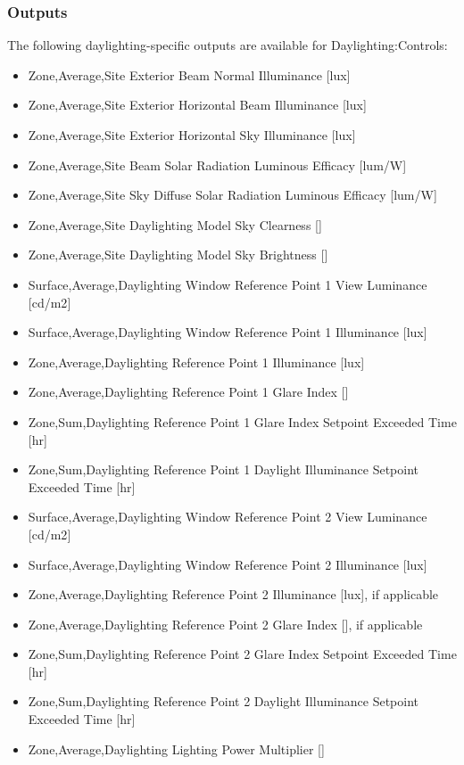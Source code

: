 \subsubsection{Outputs}\label{outputs-1-004}

The following daylighting-specific outputs are available for Daylighting:Controls:

\begin{itemize}
\item
  Zone,Average,Site Exterior Beam Normal Illuminance {[}lux{]}
\item
  Zone,Average,Site Exterior Horizontal Beam Illuminance {[}lux{]}
\item
  Zone,Average,Site Exterior Horizontal Sky Illuminance {[}lux{]}
\item
  Zone,Average,Site Beam Solar Radiation Luminous Efficacy {[}lum/W{]}
\item
  Zone,Average,Site Sky Diffuse Solar Radiation Luminous Efficacy {[}lum/W{]}
\item
  Zone,Average,Site Daylighting Model Sky Clearness {[]}
\item
  Zone,Average,Site Daylighting Model Sky Brightness {[]}
\item
  Surface,Average,Daylighting Window Reference Point 1 View Luminance {[}cd/m2{]}
\item
  Surface,Average,Daylighting Window Reference Point 1 Illuminance {[}lux{]}
\item
  Zone,Average,Daylighting Reference Point 1 Illuminance {[}lux{]}
\item
  Zone,Average,Daylighting Reference Point 1 Glare Index {[]}
\item
  Zone,Sum,Daylighting Reference Point 1 Glare Index Setpoint Exceeded Time {[}hr{]}
\item
  Zone,Sum,Daylighting Reference Point 1 Daylight Illuminance Setpoint Exceeded Time {[}hr{]}
\item
  Surface,Average,Daylighting Window Reference Point 2 View Luminance {[}cd/m2{]}
\item
  Surface,Average,Daylighting Window Reference Point 2 Illuminance {[}lux{]}
\item
  Zone,Average,Daylighting Reference Point 2 Illuminance {[}lux{]}, if applicable
\item
  Zone,Average,Daylighting Reference Point 2 Glare Index {[]}, if applicable
\item
  Zone,Sum,Daylighting Reference Point 2 Glare Index Setpoint Exceeded Time {[}hr{]}
\item
  Zone,Sum,Daylighting Reference Point 2 Daylight Illuminance Setpoint Exceeded Time {[}hr{]}
\item
  Zone,Average,Daylighting Lighting Power Multiplier {[]}
\end{itemize}

